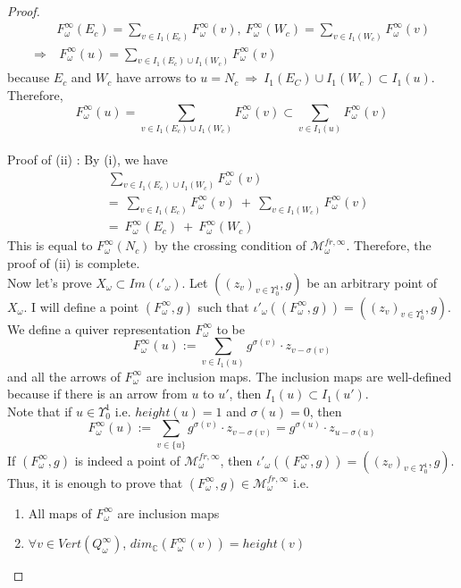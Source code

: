 \begin{proof}
\begin{align*}
&F_\omega^\infty(E_c) = \sum_{v\in I_1(E_c)} F_\omega^\infty(v),~F_\omega^\infty(W_c) = \sum_{v\in I_1(W_c)} F_\omega^\infty(v)\\
\Rightarrow &~F_\omega^\infty(u) = \sum_{v\in I_1(E_c)\cup I_1(W_c)} F_\omega^\infty(v)
\end{align*}
because $E_c$ and $W_c$ have arrows to $u=N_c~\Rightarrow~I_1(E_C)\cup I_1(W_c)\subset I_1(u)$. Therefore,
\[
F_\omega^\infty(u) = \sum_{v\in I_1(E_c)\cup I_1(W_c)} F_\omega^\infty(v)\subset \sum_{v\in I_1(u)} F_\omega^\infty(v)
\]\\
Proof of (\Rn{2}) : By (\Rn{1}), we have
\begin{align*}
&~\sum_{v\in I_1(E_c)\cup I_1(W_c)} F_\omega^\infty(v) \\
&=~\sum_{v\in I_1(E_c)} F_\omega^\infty(v)~+~\sum_{v\in I_1(W_c)} F_\omega^\infty(v)\\
&=~F_\omega^\infty(E_c)~+~F_\omega^\infty(W_c)
\end{align*}
This is equal to $F_\omega^\infty(N_c)$ by the crossing condition of $\mathcal{M}_\omega^{fr,\infty}$. Therefore, the proof of (\Rn{2}) is complete.\\
Now let's prove $X_\omega \subset Im(\iota'_\omega)$. Let $((z_v)_{v\in \Upsilon_0^1},g)$ be an arbitrary point of $X_\omega$. I will define a point $(F_\omega^\infty,g)$ such that $\iota'_\omega((F_\omega^\infty,g))=((z_v)_{v\in \Upsilon_0^1},g)$. We define a quiver representation $F_\omega^\infty$ to be 
\[
F_\omega^\infty(u):=\sum_{v\in I_1(u)}g^{\sigma(v)}\cdot z_{v-\sigma(v)}
\]
and all the arrows of $F_\omega^\infty$ are inclusion maps. The inclusion maps are well-defined because if there is an arrow from $u$ to $u'$, then $I_1(u)\subset I_1(u')$.\\
Note that if $u\in\Upsilon_0^1$ i.e. $height(u)=1$ and $\sigma(u) = 0$, then 
\[
F_\omega^\infty(u):=\sum_{v\in \{u\}}g^{\sigma(v)}\cdot z_{v-\sigma(v)} = g^{\sigma(u)}\cdot z_{u-\sigma(u)} 
\]
If $(F_\omega^\infty ,g)$ is indeed a point of $\mathcal{M}_\omega^{fr,\infty}$, then $\iota'_\omega ((F_\omega^\infty,g)) = ((z_v)_{v\in\Upsilon_0^1},g)$. Thus, it is enough to prove that $(F_\omega^\infty,g)\in\mathcal{M}_\omega^{fr,\infty}$ i.e.
\begin{enumerate}[label = (\roman*)]
\item All maps of $F_\omega^\infty$ are inclusion maps
\item $\forall v\in Vert(Q_\omega^\infty)$, $dim_\mathbb{C}(F_\omega^\infty(v)) = height(v)$

\end{enumerate}
\end{proof}
